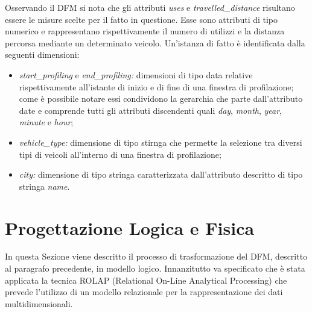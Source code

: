Osservando il DFM si nota che gli attributi \textit{uses} e \textit{travelled\_distance} risultano
essere le misure scelte per il fatto in questione. Esse sono attributi di tipo numerico e
rappresentano rispettivamente il numero di utilizzi e la distanza percorsa mediante un determinato
veicolo.
Un'istanza di fatto è identificata dalla seguenti dimensioni:
\begin{itemize}
\item \textit{start\_profiling} e \textit{end\_profiling:} dimensioni di tipo data relative
rispettivamente all'istante di inizio e di fine di una finestra di profilazione; come è possibile
notare essi condividono la gerarchia che parte dall'attributo date e comprende tutti gli 
attributi discendenti quali \textit{day}, \textit{month}, \textit{year}, \textit{minute} e
\textit{hour};
\item \textit{vehicle\_type:} dimensione di tipo stirnga che permette la selezione tra diversi
tipi di veicoli all'interno di una finestra di profilazione;
\item \textit{city:} dimensione di tipo stringa caratterizzata dall'attributo descritto di tipo
stringa \textit{name}.
\end{itemize}

\section{Progettazione Logica e Fisica}
In questa Sezione viene descritto il processo di trasformazione del DFM, descritto al paragrafo precedente, in modello logico. 
Innanzitutto va specificato che è stata applicata la tecnica ROLAP (Relational On-Line Analytical Processing) che prevede l’utilizzo di un
modello relazionale per la rappresentazione dei dati multidimensionali.
